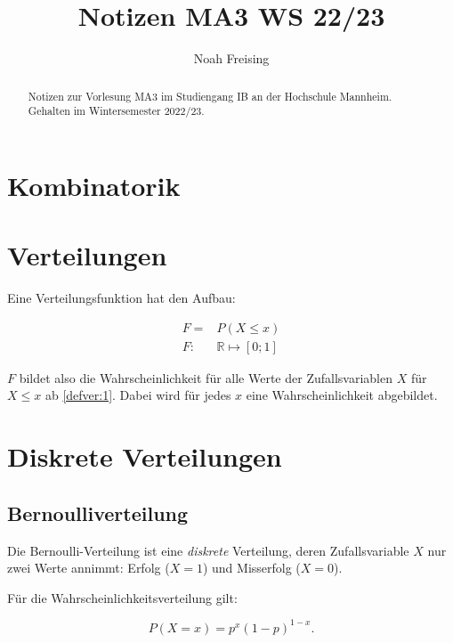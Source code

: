 \documentclass{tufte-handout}
\title{Notizen MA3 WS 22/23}
\author[Noah Freising]{Noah Freising}
\theoremstyle{own}
\begin{document}
\maketitle%

\begin{abstract}
\noindent
Notizen zur Vorlesung MA3 im Studiengang IB an der Hochschule Mannheim. Gehalten im Wintersemester 2022/23.
\end{abstract}

{\small\tableofcontents}


\section{Kombinatorik}

\section{Verteilungen}

Eine Verteilungsfunktion hat den Aufbau:

\begin{align}
F = & P(X \leq x) \label{defver:1} \\ 
F  :&  \mathbb{R} \mapsto [0;1] \label{defver:2}
\end{align}

$F$ bildet also die Wahrscheinlichkeit für alle Werte der Zufallsvariablen $X$ für $X \leq x$ ab \eqref{defver:1}. Dabei wird für jedes $x$ eine Wahrscheinlichkeit abgebildet.

\section{Diskrete Verteilungen}

\subsection{Bernoulliverteilung}

Die Bernoulli-Verteilung ist eine \textit{diskrete} Verteilung, deren Zufallsvariable $X$ nur zwei Werte annimmt: Erfolg ($X=1$) und Misserfolg ($X=0$).

Für die Wahrscheinlichkeitsverteilung gilt:

\begin{equation}
	P(X=x) = p^x (1-p)^{1-x}.
\end{equation}
\end{document}

